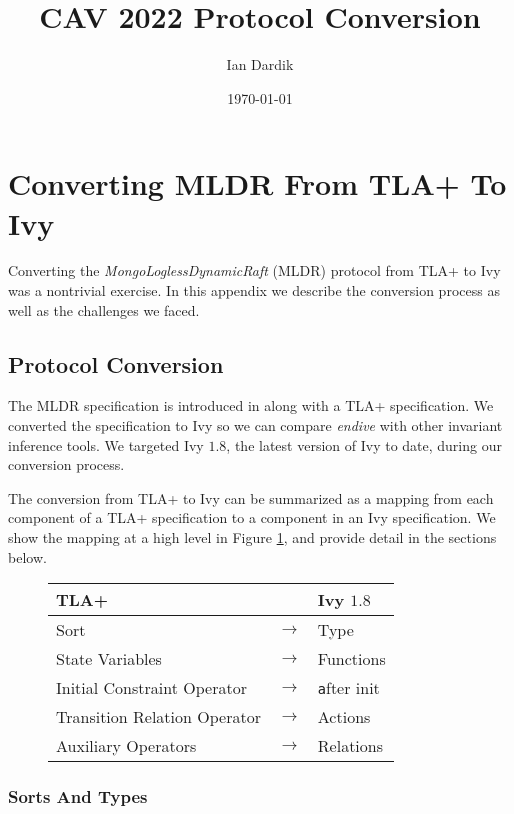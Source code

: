 \documentclass[12pt]{article}
\title{CAV 2022 Protocol Conversion}
\author{Ian Dardik}
\date{\today}
\newcommand{\ivy}[1]{{\small\texttt #1}}
\begin{document}
\maketitle


\section{Converting MLDR From TLA+ To Ivy}

Converting the \textit{MongoLoglessDynamicRaft} (MLDR) protocol from TLA+ to Ivy was a nontrivial exercise.  In this appendix we describe the conversion process as well as the challenges we faced.

\subsection{Protocol Conversion}

The MLDR specification is introduced in \cite{schultz2021design} along with a TLA+ specification.  We converted the specification to Ivy so we can compare \textit{endive} with other invariant inference tools.  We targeted Ivy $1.8$, the latest version of Ivy to date, during our conversion process.  

The conversion from TLA+ to Ivy can be summarized as a mapping from each component of a TLA+ specification to a component in an Ivy specification.  We show the mapping at a high level in Figure \ref{fig:conv-map}, and provide detail in the sections below.

\begin{figure}
  \label{fig:conv-map}
  \begin{center}
  \begin{tabular}{lcl}
    TLA+& & Ivy $1.8$\\
    \hline
    Sort& $\to$& Type\\
    State Variables& $\to$& Functions\\
    Initial Constraint Operator& $\to$& \ivy{after init}\\
    Transition Relation Operator& $\to$& Actions\\
    Auxiliary Operators& $\to$& Relations\\
  \end{tabular}
  \end{center}
\end{figure}

\subsubsection{Sorts And Types}
\end{document}
